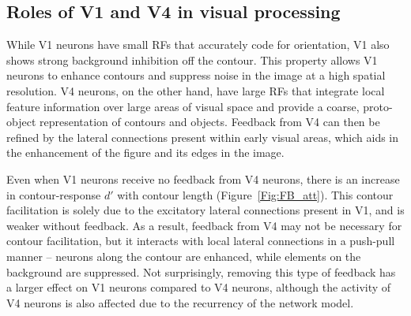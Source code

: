 \subsection{Roles of V1 and V4 in visual processing}
While V1 neurons have
small RFs that accurately code for orientation, V1 also shows strong
background inhibition off the contour. This property allows V1 neurons
to enhance contours and suppress noise in the image at a high spatial
resolution. V4 neurons, on the other hand, have large RFs that integrate
local feature information over large areas of visual space and provide
a coarse, proto-object representation of contours and objects.
Feedback from V4 can then be refined by the lateral connections present
within early visual areas, which aids in the enhancement of the figure
and its edges in the image.



Even when V1 neurons receive no feedback from V4 neurons,
there is an increase in contour-response $d'$ with contour
length (Figure~\ref{Fig:FB_att}). This contour facilitation is solely due to the excitatory
lateral connections present in V1, and
is weaker
without feedback. As a result, feedback
from V4
%
 may not be necessary for
contour facilitation, but it interacts with local lateral connections
in a push-pull manner -- neurons along the contour are enhanced, while
elements on the background are suppressed. Not surprisingly, removing
this type of
%
feedback has a larger effect on V1 neurons compared to V4 neurons,
although the activity of V4 neurons is also affected due to the
recurrency of the network model.

